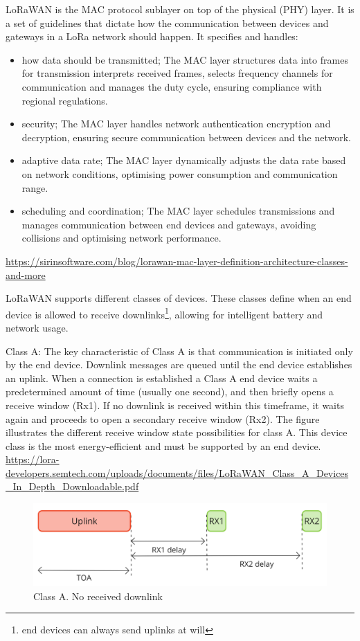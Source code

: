 \ac{LoRaWAN} is the \ac{MAC} protocol sublayer on top of the physical (PHY) layer. It is a set of guidelines that dictate how the communication between devices and gateways in a LoRa network should happen. It specifies and handles:
\begin{itemize}
    \item how data should be transmitted; The \ac{MAC} layer structures data into frames for transmission interprets received frames, selects frequency channels for communication and manages the duty cycle, ensuring compliance with regional regulations.
    \item security; The \ac{MAC} layer handles network authentication encryption and decryption, ensuring secure communication between devices and the network.
    \item adaptive data rate; The \ac{MAC} layer dynamically adjusts the data rate based on network conditions, optimising power consumption and communication range.
    \item scheduling and coordination; The \ac{MAC} layer schedules transmissions and manages communication between end devices and gateways, avoiding collisions and optimising network performance.
\end{itemize}

\url{https://sirinsoftware.com/blog/lorawan-mac-layer-definition-architecture-classes-and-more}

\ac{LoRaWAN} supports different classes of devices. These classes define when an end device is allowed to receive downlinks\footnote{end devices can always send uplinks at will}, allowing for intelligent battery and network usage.

Class A: The key characteristic of Class A is that communication is initiated only by the end device. Downlink messages are queued until the end device establishes an uplink. When a connection is established a Class A end device waits a predetermined amount of time (usually one second), and then briefly opens a receive window (Rx1). If no downlink is received within this timeframe, it waits again and proceeds to open a secondary receive window (Rx2). The figure illustrates the different receive window state possibilities for class A. 
This device class is the most energy-efficient and must be supported by an end device.
\url{https://lora-developers.semtech.com/uploads/documents/files/LoRaWAN_Class_A_Devices_In_Depth_Downloadable.pdf}

\begin{figure}[H]
    \centering
    \includegraphics[width=0.5\linewidth]{figures/ClassA_1.jpg}
    \caption{Class A. No received downlink}
    \label{fig:ClassA-no}
\end{figure}

